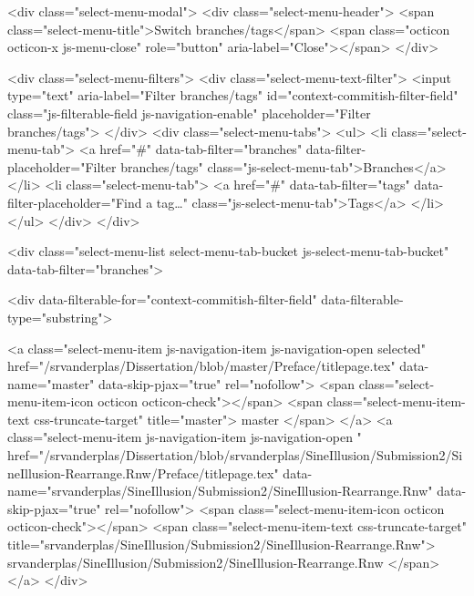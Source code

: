     <div class="select-menu-modal">
      <div class="select-menu-header">
        <span class="select-menu-title">Switch branches/tags</span>
        <span class="octicon octicon-x js-menu-close" role="button" aria-label="Close"></span>
      </div>

      <div class="select-menu-filters">
        <div class="select-menu-text-filter">
          <input type="text" aria-label="Filter branches/tags" id="context-commitish-filter-field" class="js-filterable-field js-navigation-enable" placeholder="Filter branches/tags">
        </div>
        <div class="select-menu-tabs">
          <ul>
            <li class="select-menu-tab">
              <a href="#" data-tab-filter="branches" data-filter-placeholder="Filter branches/tags" class="js-select-menu-tab">Branches</a>
            </li>
            <li class="select-menu-tab">
              <a href="#" data-tab-filter="tags" data-filter-placeholder="Find a tag…" class="js-select-menu-tab">Tags</a>
            </li>
          </ul>
        </div>
      </div>

      <div class="select-menu-list select-menu-tab-bucket js-select-menu-tab-bucket" data-tab-filter="branches">

        <div data-filterable-for="context-commitish-filter-field" data-filterable-type="substring">


            <a class="select-menu-item js-navigation-item js-navigation-open selected"
               href="/srvanderplas/Dissertation/blob/master/Preface/titlepage.tex"
               data-name="master"
               data-skip-pjax="true"
               rel="nofollow">
              <span class="select-menu-item-icon octicon octicon-check"></span>
              <span class="select-menu-item-text css-truncate-target" title="master">
                master
              </span>
            </a>
            <a class="select-menu-item js-navigation-item js-navigation-open "
               href="/srvanderplas/Dissertation/blob/srvanderplas/SineIllusion/Submission2/SineIllusion-Rearrange.Rnw/Preface/titlepage.tex"
               data-name="srvanderplas/SineIllusion/Submission2/SineIllusion-Rearrange.Rnw"
               data-skip-pjax="true"
               rel="nofollow">
              <span class="select-menu-item-icon octicon octicon-check"></span>
              <span class="select-menu-item-text css-truncate-target" title="srvanderplas/SineIllusion/Submission2/SineIllusion-Rearrange.Rnw">
                srvanderplas/SineIllusion/Submission2/SineIllusion-Rearrange.Rnw
              </span>
            </a>
        </div>

